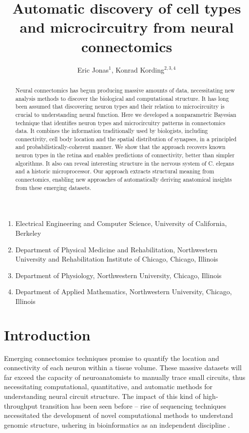 \documentclass{article}
\title{Automatic discovery of cell types and microcircuitry from neural connectomics}
\author{Eric Jonas$^1$, Konrad Kording$^{2, 3,4}$}
\begin{document}
\maketitle

\begin{small}
\begin{enumerate}
  \item Electrical Engineering and Computer Science, University of California, Berkeley
  \item Department of Physical Medicine and Rehabilitation,
    Northwestern University and Rehabilitation Institute of Chicago,
    Chicago, Illinois
  \item Department of Physiology, Northwestern University, Chicago, Illinois
  \item Department of Applied Mathematics, Northwestern University, Chicago, Illinois
\end{enumerate}
\end{small}

\begin{abstract}
  Neural connectomics has begun producing massive amounts of data,
  necessitating new analysis methods to discover the biological and
  computational structure. It has long been assumed that discovering
  neuron types and their relation to microcircuitry is crucial to
  understanding neural function. Here we developed a nonparametric
  Bayesian technique that identifies neuron types and microcircuitry
  patterns in connectomics data. It combines the information
  traditionally used by biologists, including connectivity, cell body
  location and the spatial distribution of synapses, in a
  principled and probabilistically-coherent manner. We show that the
  approach recovers known neuron types in the retina and enables
  predictions of connectivity, better than simpler algorithms. It also
  can reveal interesting structure in the nervous system of
  C. elegans and a historic microprocessor.
  Our approach extracts structural meaning from
  connectomics, enabling new approaches of automatically deriving
  anatomical insights from these emerging datasets.
\end{abstract}

\section*{Introduction}
Emerging connectomics techniques \autocite{Morgan2013,Zador2012}
promise to quantify the location and connectivity of each neuron
within a tissue volume. These massive datasets will far exceed the
capacity of neuroanatomists to manually trace small circuits, thus
necessitating computational, quantitative, and automatic methods for
understanding neural circuit structure.  The impact of this kind of
high-throughput transition has been seen before -- rise of sequencing
techniques necessitated the development of novel computational methods
to understand genomic structure, ushering in  bioinformatics
as an independent discipline \autocite{Koboldt2013}.
\end{document}
